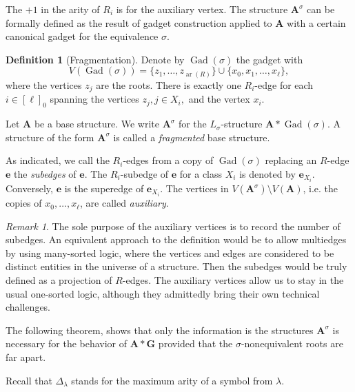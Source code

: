 \documentclass[11pt]{article}
\theoremstyle{plain}
\theoremstyle{definition}
\newtheorem{definition}{Definition}
\theoremstyle{remark}
\newtheorem*{remark}{Remark}
\DeclareMathOperator\Gad{Gad}
\DeclareMathOperator\aritysym{ar}
\newcommand{\arity}[1]{{\aritysym({#1})}}
\newcommand{\str}[1]{\mathbf{#1}}
\newcommand{\maxarity}[1]{\Delta_{#1}}
\newcommand{\tpl}[1]{{\bm{#1}}}
\begin{document}
The $+1$ in the arity of $R_i$ is for the auxiliary vertex.
The structure $\str{A}^\sigma$ can be formally defined as the result of gadget construction applied to $\str{A}$ with a certain canonical gadget for the equivalence $\sigma$.

\begin{definition}[Fragmentation]\label{def:fragmentation}
    Denote by $\Gad(\sigma)$ the gadget with
    \[
        V(\Gad(\sigma)) = \{z_1, \dots, z_{\arity{R}}\} \cup \{x_0, x_1, \dots, x_\ell\},
    \]
    where the vertices $z_j$ are the roots.
    There is exactly one $R_i$-edge for each $i \in [\ell]_0$ spanning the vertices $z_j, j \in X_i,$ and the vertex $x_i$.
    
    Let $\str{A}$ be a base structure.
    We write $\str{A}^\sigma$ for the $L_\sigma$-structure $\str{A} * \Gad(\sigma)$.
    A structure of the form $\str{A}^\sigma$ is called a \emph{fragmented} base structure.
\end{definition}


As indicated, we call the $R_i$-edges from a copy of $\Gad(\sigma)$ replacing an $R$-edge $\tpl{e}$ the \emph{subedges} of $\tpl{e}$.
The $R_i$-subedge of $\tpl{e}$ for a class $X_i$ is denoted by $\tpl{e}_{X_i}$.
Conversely, $\tpl{e}$ is the superedge of $\tpl{e}_{X_i}$.
The vertices in $V(\str{A}^\sigma) \setminus V(\str{A})$, i.e. the copies of $x_0, \dots, x_\ell$, are called \emph{auxiliary}.

\begin{remark}
    The sole purpose of the auxiliary vertices is to record the number of subedges.
    An equivalent approach to the definition would be to allow multiedges by using many-sorted logic, where the vertices and edges are considered to be distinct entities in the universe of a structure.
    Then the subedges would be truly defined as a projection of $R$-edges.
    The auxiliary vertices allow us to stay in the usual one-sorted logic, although they admittedly bring their own technical challenges.
\end{remark}

The following theorem, shows that only the information is the structures $\str{A}^\sigma$ is necessary for the behavior of $\str{A}*\str{G}$ provided that the $\sigma$-nonequivalent roots are far apart.

Recall that $\maxarity{\lambda}$ stands for the maximum arity of a symbol from $\lambda$.
\end{document}
